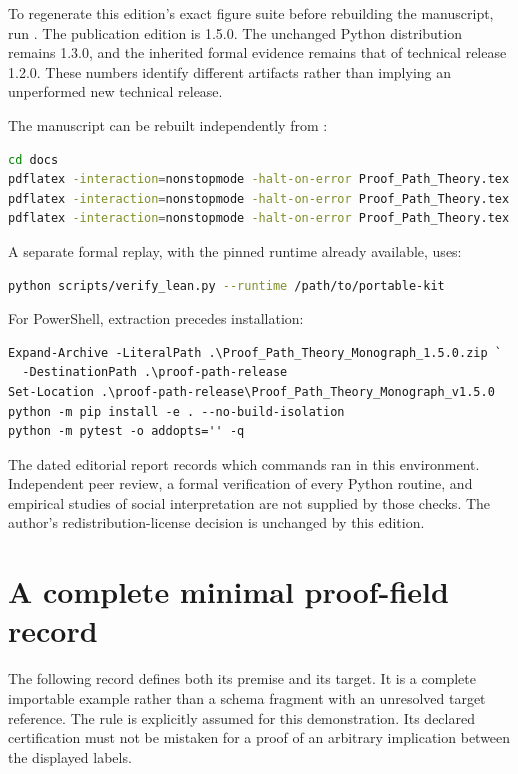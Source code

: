 \documentclass[11pt,oneside]{article}
\theoremstyle{komorebiplain}
\theoremstyle{komorebidefinition}
\theoremstyle{komorebiremark}
\begin{document}
To regenerate this edition's exact figure suite before rebuilding the manuscript, run . The publication edition is 1.5.0. The unchanged Python distribution remains 1.3.0, and the inherited formal evidence remains that of technical release 1.2.0. These numbers identify different artifacts rather than implying an unperformed new technical release.

The manuscript can be rebuilt independently from :
\begin{lstlisting}[language=bash]
cd docs
pdflatex -interaction=nonstopmode -halt-on-error Proof_Path_Theory.tex
pdflatex -interaction=nonstopmode -halt-on-error Proof_Path_Theory.tex
pdflatex -interaction=nonstopmode -halt-on-error Proof_Path_Theory.tex
\end{lstlisting}

A separate formal replay, with the pinned runtime already available, uses:
\begin{lstlisting}[language=bash]
python scripts/verify_lean.py --runtime /path/to/portable-kit
\end{lstlisting}

For PowerShell, extraction precedes installation:
\begin{lstlisting}[language={},basicstyle=\ttfamily\fontsize{9.5}{11.4}\selectfont]
Expand-Archive -LiteralPath .\Proof_Path_Theory_Monograph_1.5.0.zip `
  -DestinationPath .\proof-path-release
Set-Location .\proof-path-release\Proof_Path_Theory_Monograph_v1.5.0
python -m pip install -e . --no-build-isolation
python -m pytest -o addopts='' -q
\end{lstlisting}

The dated editorial report records which commands ran in this environment. Independent peer review, a formal verification of every Python routine, and empirical studies of social interpretation are not supplied by those checks. The author's redistribution-license decision is unchanged by this edition.

\clearpage
\section{A complete minimal proof-field record}
\label{app:schema}

The following record defines both its premise and its target. It is a complete importable example rather than a schema fragment with an unresolved target reference. The rule is explicitly assumed for this demonstration. Its declared certification must not be mistaken for a proof of an arbitrary implication between the displayed labels.
\end{document}
